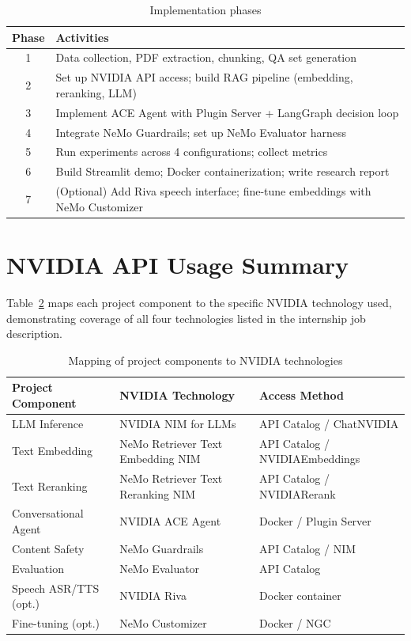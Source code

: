 \documentclass[a4paper,11pt]{article}
\begin{document}
\begin{table}[h]
\centering
\begin{tabular}{|c|l|}
\hline
\textbf{Phase} & \textbf{Activities} \\
\hline
1 & Data collection, PDF extraction, chunking, QA set generation \\
2 & Set up NVIDIA API access; build RAG pipeline (embedding, reranking, LLM) \\
3 & Implement ACE Agent with Plugin Server + LangGraph decision loop \\
4 & Integrate NeMo Guardrails; set up NeMo Evaluator harness \\
5 & Run experiments across 4 configurations; collect metrics \\
6 & Build Streamlit demo; Docker containerization; write research report \\
7 & (Optional) Add Riva speech interface; fine-tune embeddings with NeMo Customizer \\
\hline
\end{tabular}
\caption{Implementation phases}
\label{tab:timeline}
\end{table}

\section{NVIDIA API Usage Summary}
Table~\ref{tab:nvidia-apis} maps each project component to the specific NVIDIA technology used, demonstrating coverage of all four technologies listed in the internship job description.

\begin{table}[h]
\centering
\begin{tabular}{|l|l|l|}
\hline
\textbf{Project Component} & \textbf{NVIDIA Technology} & \textbf{Access Method} \\
\hline
LLM Inference & NVIDIA NIM for LLMs & API Catalog / ChatNVIDIA \\
Text Embedding & NeMo Retriever Text Embedding NIM & API Catalog / NVIDIAEmbeddings \\
Text Reranking & NeMo Retriever Text Reranking NIM & API Catalog / NVIDIARerank \\
Conversational Agent & NVIDIA ACE Agent & Docker / Plugin Server \\
Content Safety & NeMo Guardrails & API Catalog / NIM \\
Evaluation & NeMo Evaluator & API Catalog \\
Speech ASR/TTS (opt.) & NVIDIA Riva & Docker container \\
Fine-tuning (opt.) & NeMo Customizer & Docker / NGC \\
\hline
\end{tabular}
\caption{Mapping of project components to NVIDIA technologies}
\label{tab:nvidia-apis}
\end{table}
\end{document}
